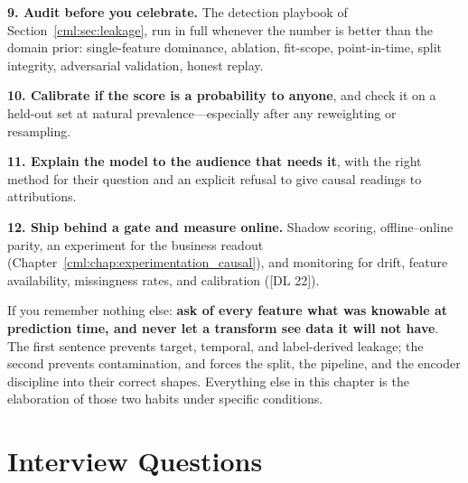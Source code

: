 \textbf{9. Audit before you celebrate.} The detection playbook of Section~\ref{cml:sec:leakage}, run in full whenever the number is better than the domain prior: single-feature dominance, ablation, fit-scope, point-in-time, split integrity, adversarial validation, honest replay.

\textbf{10. Calibrate if the score is a probability to anyone}, and check it on a held-out set at natural prevalence---especially after any reweighting or resampling.

\textbf{11. Explain the model to the audience that needs it}, with the right method for their question and an explicit refusal to give causal readings to attributions.

\textbf{12. Ship behind a gate and measure online.} Shadow scoring, offline--online parity, an experiment for the business readout (Chapter~\ref{cml:chap:experimentation_causal}), and monitoring for drift, feature availability, missingness rates, and calibration ([DL 22]).

\begin{keyinsight}
If you remember nothing else: \textbf{ask of every feature what was knowable at prediction time, and never let a transform see data it will not have}. The first sentence prevents target, temporal, and label-derived leakage; the second prevents contamination, and forces the split, the pipeline, and the encoder discipline into their correct shapes. Everything else in this chapter is the elaboration of those two habits under specific conditions.
\end{keyinsight}

\section{Interview Questions}
\label{cml:sec:applied_craft_interview}

